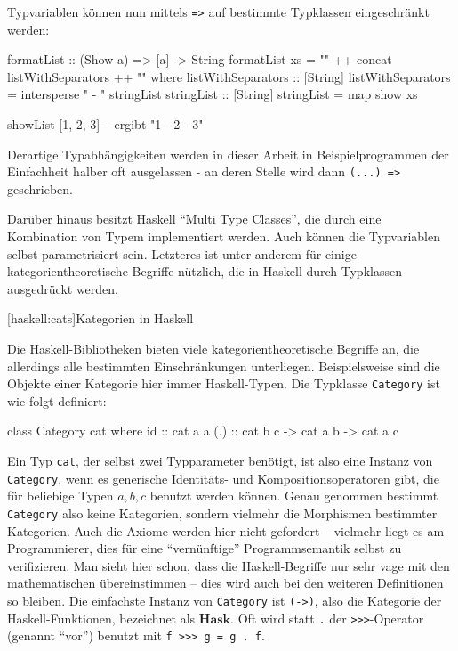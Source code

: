 \documentclass[12pt, a4paper, bibgerm]{scrbook}
\newenvironment{DIFnomarkup}{}{}
\newcommand\icode[1]{\lstinline?#1?}
\newcommand\lsection{}
\begin{document}
Typvariablen können nun mittels \icode{=>} auf bestimmte Typklassen
eingeschränkt werden:
\begin{DIFnomarkup}\begin{code}
formatList :: (Show a) => [a] -> String
formatList xs = "{" ++ concat listWithSeparators ++ "}"
  where listWithSeparators :: [String]
        listWithSeparators = intersperse " - " stringList
        stringList :: [String]
        stringList = map show xs

showList [1, 2, 3] -- ergibt "{1 - 2 - 3}"
\end{code}\end{DIFnomarkup}

Derartige Typabhängigkeiten werden in dieser Arbeit in
Beispielprogrammen der Einfachheit halber oft ausgelassen - an deren
Stelle wird dann \icode{(...) =>} geschrieben.

Darüber hinaus besitzt Haskell ``Multi Type Classes'', die durch eine
Kombination von Typem implementiert werden. Auch können die Typvariablen
selbst parametrisiert sein. Letzteres ist unter anderem für einige
kategorientheoretische Begriffe nützlich, die in Haskell durch
Typklassen ausgedrückt werden.

\lsection[haskell:cats]{Kategorien in Haskell}

Die Haskell-Bibliotheken bieten viele kategorientheoretische Begriffe an,
die allerdings alle bestimmten Einschränkungen
unterliegen. Beispielsweise sind die Objekte einer Kategorie hier immer
Haskell-Typen. Die Typklasse \icode{Category} ist wie folgt definiert:
\begin{DIFnomarkup}\begin{code}
class Category cat where
  id   :: cat a a
  (.)  :: cat b c -> cat a b -> cat a c
\end{code}\end{DIFnomarkup}
Ein Typ \icode{cat}, der selbst zwei Typparameter benötigt, ist also eine
Instanz von \icode{Category}, wenn es generische Identitäts- und
Kompositionsoperatoren gibt, die für beliebige Typen $a,b,c$ benutzt
werden können. Genau genommen bestimmt \icode{Category} also keine
Kategorien, sondern vielmehr die Morphismen bestimmter Kategorien. Auch
die Axiome werden hier nicht gefordert -- vielmehr liegt es am
Programmierer, dies für eine "`vernünftige"' Programmsemantik selbst zu
verifizieren. Man sieht hier schon, dass die Haskell-Begriffe nur sehr
vage mit den mathematischen übereinstimmen -- dies wird auch bei den
weiteren Definitionen so bleiben. Die einfachste Instanz von
\icode{Category} ist \icode{(->)}, also die Kategorie der
Haskell-Funktionen, bezeichnet als $\mathbf{Hask}$.
Oft wird statt \icode{.} der \icode{>>>}-Operator (genannt "`vor"') %
benutzt mit \icode{f >>> g = g . f}. %
\end{document}

